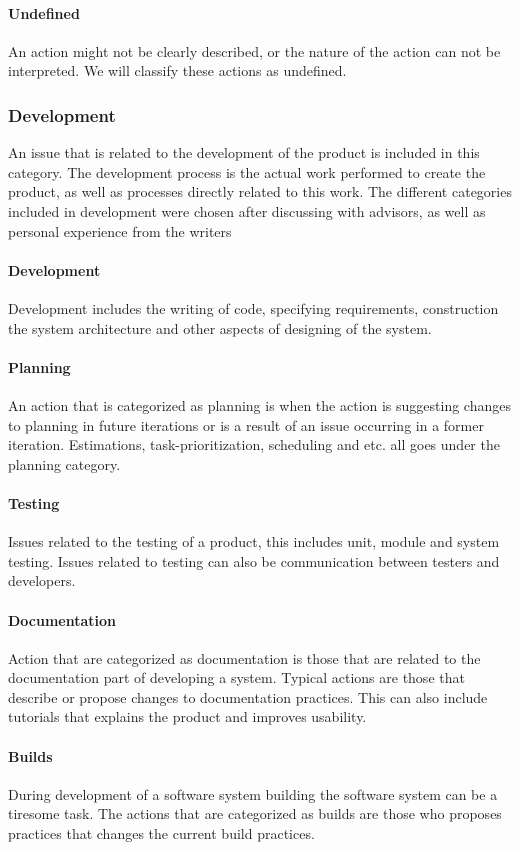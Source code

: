 \paragraph{Undefined}
An action might not be clearly described, or the nature of the action can not be interpreted. We will classify these actions as undefined.

\subsubsection{Development}
An issue that is related to the development of the product is included in this category. The development process is the actual work performed to create the product, as well as processes directly related to this work. The different categories included in development were chosen after discussing with advisors, as well as personal experience from the writers
\paragraph{Development}
Development includes the writing of code, specifying requirements, construction the system architecture and other aspects of designing of the system. 
\paragraph{Planning}
An action that is categorized as planning is when the action is suggesting changes to planning in future iterations or is a result of an issue occurring in a former iteration. Estimations, task-prioritization, scheduling and etc. all goes under the planning category.
\paragraph{Testing}
Issues related to the testing of a product, this includes unit, module and system testing. Issues related to testing can also be communication between testers and developers.
\paragraph{Documentation}
Action that are categorized as documentation is those that are related to the documentation part of developing a system. Typical actions are those that describe or propose changes to documentation practices. This can also include tutorials that explains the product and improves usability. 
\paragraph{Builds}
During development of a software system building the software system can be a tiresome task. The actions that are categorized as builds are those who proposes practices that changes the current build practices.
